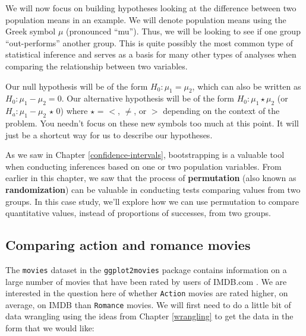 \documentclass[12pt, krantz2,]{krantz}
\makeatletter
\newenvironment{Shaded}{\begin{snugshade}}{\end{snugshade}}
\newcommand{\KeywordTok}[1]{\textcolor[rgb]{0.27,0.27,0.27}{\textbf{#1}}}
\newcommand{\NormalTok}[1]{#1}
\newcommand{\OperatorTok}[1]{\textcolor[rgb]{0.43,0.43,0.43}{\textbf{#1}}}
\newcommand{\StringTok}[1]{\textcolor[rgb]{0.5,0.5,0.5}{#1}}
\newenvironment{kframe}{%
\medskip{}
\setlength{\fboxsep}{.8em}
 \def\at@end@of@kframe{}%
 \ifinner\ifhmode%
  \def\at@end@of@kframe{\end{minipage}}%
  \begin{minipage}{\columnwidth}%
 \fi\fi%
 \def\FrameCommand##1{\hskip\@totalleftmargin \hskip-\fboxsep
 \colorbox{shadecolor}{##1}\hskip-\fboxsep
     \hskip-\linewidth \hskip-\@totalleftmargin \hskip\columnwidth}%
 \MakeFramed {\advance\hsize-\width
   \@totalleftmargin\z@ \linewidth\hsize
   \@setminipage}}%
 {\par\unskip\endMakeFramed%
 \at@end@of@kframe}
\renewenvironment{Shaded}{\begin{kframe}}{\end{kframe}}
\makeatother
\begin{document}
We will now focus on building hypotheses looking at the difference between two population means in an example. We will denote population means using the Greek symbol \(\mu\) (pronounced ``mu''). Thus, we will be looking to see if one group ``out-performs'' another group. This is quite possibly the most common type of statistical inference and serves as a basis for many other types of analyses when comparing the relationship between two variables.

Our null hypothesis will be of the form \(H_0: \mu_1 = \mu_2\), which can also be written as \(H_0: \mu_1 - \mu_2 = 0\). Our alternative hypothesis will be of the form \(H_0: \mu_1 \star \mu_2\) (or \(H_a: \mu_1 - \mu_2 \, \star \, 0\)) where \(\star\) = \(<\), \(\ne\), or \(>\) depending on the context of the problem. You needn't focus on these new symbols too much at this point. It will just be a shortcut way for us to describe our hypotheses.

As we saw in Chapter \ref{confidence-intervals}, bootstrapping is a valuable tool when conducting inferences based on one or two population variables. From earlier in this chapter, we saw that the process of \textbf{permutation} (also known as \textbf{randomization}) can be valuable in conducting tests comparing values from two groups. In this case study, we'll explore how we can use permutation to compare quantitative values, instead of proportions of successes, from two groups.

\hypertarget{comparing-action-and-romance-movies}{%
\subsection{Comparing action and romance movies}\label{comparing-action-and-romance-movies}}

The \texttt{movies} dataset in the \texttt{ggplot2movies} package contains information on a large number of movies that have been rated by users of IMDB.com \citep{R-ggplot2movies}. We are interested in the question here of whether \texttt{Action} movies are rated higher, on average, on IMDB than \texttt{Romance} movies. We will first need to do a little bit of data wrangling using the ideas from Chapter \ref{wrangling} to get the data in the form that we would like:

\begin{Shaded}
\end{Shaded}
\end{document}
